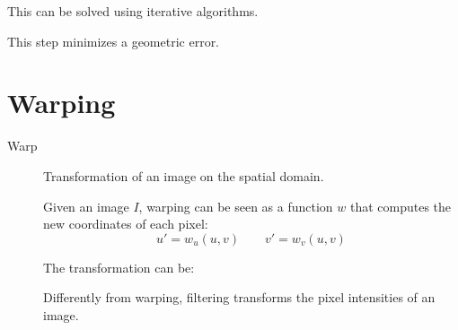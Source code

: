 \begin{description}
        This can be solved using iterative algorithms.

        \begin{remark}
            This step minimizes a geometric error.
        \end{remark}
\end{description}



\section{Warping}

\begin{description}
    \item[Warp] 
        Transformation of an image on the spatial domain.

        Given an image $I$, warping can be seen as a function $w$ that computes the new coordinates of each pixel:
        \[ u' = w_u(u, v) \hspace{2em} v' = w_v(u, v) \]

        The transformation can be:

        \begin{remark}
            Differently from warping, filtering transforms the pixel intensities of an image.
        \end{remark}
\end{description}


